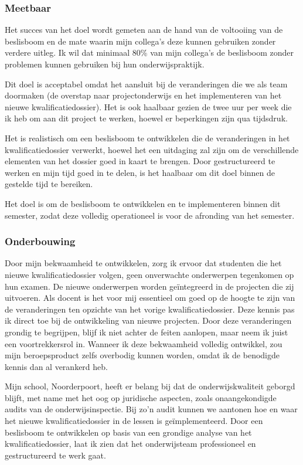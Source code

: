 \subsubsection{Meetbaar}
Het succes van het doel wordt gemeten aan de hand van de voltooiing van de beslisboom en de mate waarin mijn collega's deze kunnen gebruiken zonder verdere uitleg. Ik wil dat minimaal 80\% van mijn collega's de beslisboom zonder problemen kunnen gebruiken bij hun onderwijspraktijk.

Dit doel is acceptabel omdat het aansluit bij de veranderingen die we als team doormaken (de overstap naar projectonderwijs en het implementeren van het nieuwe kwalificatiedossier). Het is ook haalbaar gezien de twee uur per week die ik heb om aan dit project te werken, hoewel er beperkingen zijn qua tijdsdruk.

Het is realistisch om een beslisboom te ontwikkelen die de veranderingen in het kwalificatiedossier verwerkt, hoewel het een uitdaging zal zijn om de verschillende elementen van het dossier goed in kaart te brengen. Door gestructureerd te werken en mijn tijd goed in te delen, is het haalbaar om dit doel binnen de gestelde tijd te bereiken.

Het doel is om de beslisboom te ontwikkelen en te implementeren binnen dit semester, zodat deze volledig operationeel is voor de afronding van het semester.

\subsubsection{Onderbouwing}
Door mijn bekwaamheid te ontwikkelen, zorg ik ervoor dat studenten die het nieuwe kwalificatiedossier volgen, geen onverwachte onderwerpen tegenkomen op hun examen. De nieuwe onderwerpen worden geïntegreerd in de projecten die zij uitvoeren. Als docent is het voor mij essentieel om goed op de hoogte te zijn van de veranderingen ten opzichte van het vorige kwalificatiedossier. Deze kennis pas ik direct toe bij de ontwikkeling van nieuwe projecten. Door deze veranderingen grondig te begrijpen, blijf ik niet achter de feiten aanlopen, maar neem ik juist een voortrekkersrol in. Wanneer ik deze bekwaamheid volledig ontwikkel, zou mijn beroepsproduct zelfs overbodig kunnen worden, omdat ik de benodigde kennis dan al verankerd heb.

Mijn school, Noorderpoort, heeft er belang bij dat de onderwijskwaliteit geborgd blijft, met name met het oog op juridische aspecten, zoals onaangekondigde audits van de onderwijsinspectie. Bij zo’n audit kunnen we aantonen hoe en waar het nieuwe kwalificatiedossier in de lessen is geïmplementeerd. Door een beslisboom te ontwikkelen op basis van een grondige analyse van het kwalificatiedossier, laat ik zien dat het onderwijsteam professioneel en gestructureerd te werk gaat.

